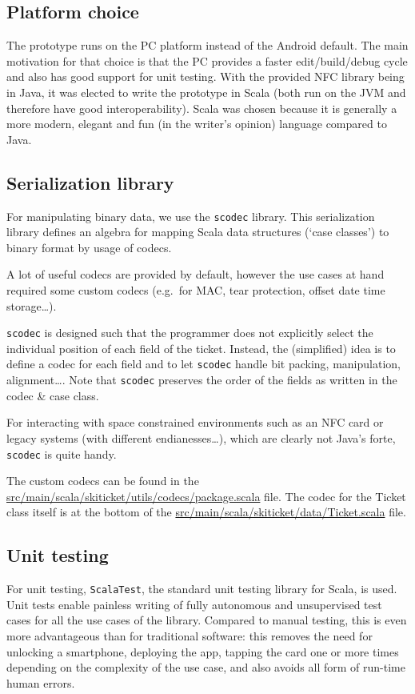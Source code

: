 \documentclass[paper=a4, fontsize=11pt]{scrartcl}
\begin{document}
\subsection{Platform choice}

The prototype runs on the PC platform instead of the Android default.
The main motivation for that choice is that the PC provides a faster
edit/build/debug cycle and also has good support for unit testing.
With the provided NFC library being in Java, it was elected to write the
prototype in Scala (both run on the JVM and therefore have good
interoperability).
Scala was chosen because it is generally a more modern, elegant and fun (in the
writer's opinion) language compared to Java.

\subsection{Serialization library}

For manipulating binary data, we use the \texttt{scodec} library.
This serialization library defines an algebra for mapping Scala data structures
(`case classes') to binary format by usage of codecs. 

A lot of useful codecs are provided by default, however the use cases at hand
required some custom codecs (e.g.\ for MAC, tear protection, offset date time storage\ldots).

\texttt{scodec} is designed such that the programmer does not explicitly select
the individual position of each field of the ticket. Instead, the (simplified)
idea is to define a codec for each field and to let \texttt{scodec} handle bit
packing, manipulation, alignment\ldots.
Note that \texttt{scodec} preserves the order of the fields as written in the
codec \& case class.

For interacting with space constrained environments such as an NFC card or
legacy systems (with different endianesses\ldots), which are clearly not Java's
forte, \texttt{scodec} is quite handy.

The custom codecs can be found in the
\url{src/main/scala/skiticket/utils/codecs/package.scala} file.
The codec for the Ticket class itself is at the bottom of the
\url{src/main/scala/skiticket/data/Ticket.scala} file.

\subsection{Unit testing}

For unit testing, \texttt{ScalaTest}, the standard unit testing library for
Scala, is used.
Unit tests enable painless writing of fully autonomous and unsupervised test
cases for all the use cases of the library.
Compared to manual testing, this is even more advantageous than for traditional
software: this removes the need for unlocking a smartphone, deploying the app,
tapping the card one or more times depending on the complexity of the use case,
and also avoids all form of run-time human errors.
\end{document}

